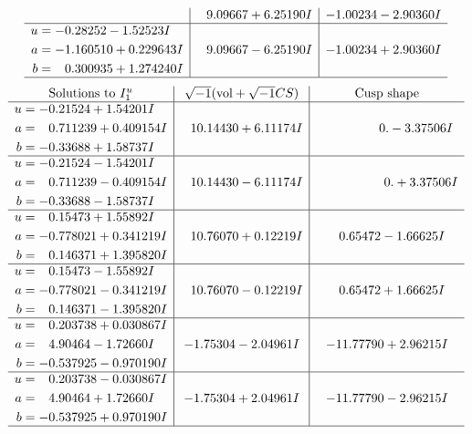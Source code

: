 \documentclass[1p]{elsarticle_modified}
\theoremstyle{definition}
\newcommand{\I}{\sqrt{-1}}
\begin{document}
$$\begin{array}{c|c|c}
 & \phantom{-}9.09667 + 6.25190 I & -1.00234 - 2.90360 I \\ \hline\begin{aligned}
u &= -0.28252 - 1.52523 I \\
a &= -1.160510 + 0.229643 I \\
b &= \phantom{-}0.300935 + 1.274240 I\end{aligned}
 & \phantom{-}9.09667 - 6.25190 I & -1.00234 + 2.90360 I\\
 \hline 
 \end{array}$$\newpage$$\begin{array}{c|c|c}  
\text{Solutions to }I^u_{1}& \I (\text{vol} + \sqrt{-1}CS) & \text{Cusp shape}\\
 \hline 
\begin{aligned}
u &= -0.21524 + 1.54201 I \\
a &= \phantom{-}0.711239 + 0.409154 I \\
b &= -0.33688 + 1.58737 I\end{aligned}
 & \phantom{-}10.14430 + 6.11174 I & \phantom{-0.000000 } 0. - 3.37506 I \\ \hline\begin{aligned}
u &= -0.21524 - 1.54201 I \\
a &= \phantom{-}0.711239 - 0.409154 I \\
b &= -0.33688 - 1.58737 I\end{aligned}
 & \phantom{-}10.14430 - 6.11174 I & \phantom{-0.000000 -}0. + 3.37506 I \\ \hline\begin{aligned}
u &= \phantom{-}0.15473 + 1.55892 I \\
a &= -0.778021 + 0.341219 I \\
b &= \phantom{-}0.146371 + 1.395820 I\end{aligned}
 & \phantom{-}10.76070 + 0.12219 I & \phantom{-}0.65472 - 1.66625 I \\ \hline\begin{aligned}
u &= \phantom{-}0.15473 - 1.55892 I \\
a &= -0.778021 - 0.341219 I \\
b &= \phantom{-}0.146371 - 1.395820 I\end{aligned}
 & \phantom{-}10.76070 - 0.12219 I & \phantom{-}0.65472 + 1.66625 I \\ \hline\begin{aligned}
u &= \phantom{-}0.203738 + 0.030867 I \\
a &= \phantom{-}4.90464 - 1.72660 I \\
b &= -0.537925 - 0.970190 I\end{aligned}
 & -1.75304 - 2.04961 I & -11.77790 + 2.96215 I \\ \hline\begin{aligned}
u &= \phantom{-}0.203738 - 0.030867 I \\
a &= \phantom{-}4.90464 + 1.72660 I \\
b &= -0.537925 + 0.970190 I\end{aligned}
 & -1.75304 + 2.04961 I & -11.77790 - 2.96215 I\\
 \hline 
 \end{array}$$\newpage\newpage\renewcommand{\arraystretch}{1}
\end{document}
